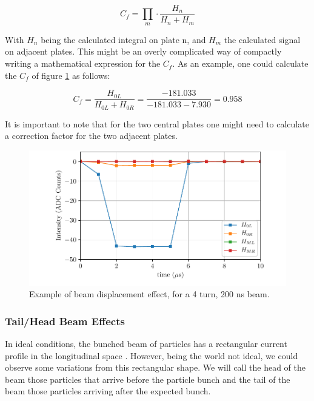 \begin{equation}
    C_f = \prod_{m}  \cdot \frac{H_n}{H_n + H_m}
\end{equation}

With $H_{n}$ being the calculated integral on plate n, and $H_{m}$ the calculated signal on adjacent plates. This might be an overly complicated way of compactly writing a mathematical expression for the $C_{f}$. As an example, one could calculate the $C_{f}$ of figure \ref{fig:BeamDisplacement} as follows:  

\begin{equation}
    C_f = \frac{H_{0L}}{H_{0L}+H_{0R}} = \frac{-181.033}{-181.033-7.930} = 0.958
\end{equation}

It is important to note that for the two central plates one might need to calculate a correction factor for the two adjacent plates. 

\begin{figure}[h]
    \centering
    \includegraphics[width=\columnwidth]{Figure_BeamDisplacement/BeamDispEff.pdf}
    \caption{Example of beam displacement effect, for a 4 turn, 200 ns beam. }
    \label{fig:BeamDisplacement}
\end{figure}

\subsubsection{Tail/Head Beam Effects}

In ideal conditions, the bunched beam of particles has a rectangular current profile in the longitudinal space \parencite[][]{ref:headtail}. However, being the world not ideal, we could observe some variations from this rectangular shape. We will call the head of the beam those particles that arrive before the particle bunch and the tail of the beam those particles arriving after the expected bunch. 

